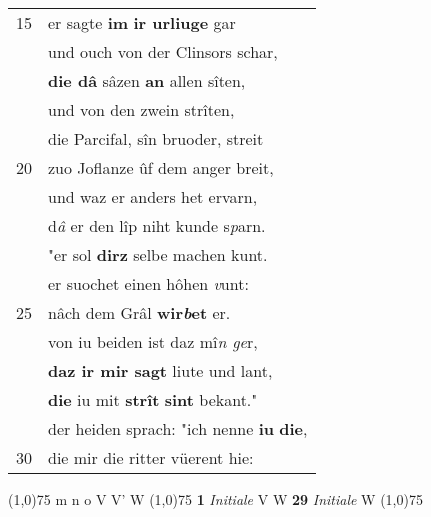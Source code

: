 \documentclass[8pt,a4paper,notitlepage]{article}
\begin{document}
\begin{table}[ht]
\begin{minipage}[t]{0.5\linewidth}
\begin{tabular}{rl}
15 & er sagte \textbf{im} \textbf{ir urliuge} gar\\ 
 & und ouch von der Clinsors schar,\\ 
 & \textbf{die dâ} sâzen \textbf{an} allen sîten,\\ 
 & und von den zwein strîten,\\ 
 & die Parcifal, sîn bruoder, streit\\ 
20 & zuo Joflanze ûf dem anger breit,\\ 
 & und waz er anders het ervarn,\\ 
 & d\textit{â} er den lîp niht kunde s\textit{p}arn.\\ 
 & "er sol \textbf{dirz} selbe machen kunt.\\ 
 & er suochet einen hôhen \textit{v}unt:\\ 
25 & nâch dem Grâl \textbf{wir\textit{b}et} er.\\ 
 & von iu beiden ist daz mî\textit{n ge}r,\\ 
 & \textbf{daz ir mir sagt} liute und lant,\\ 
 & \textbf{die} iu mit \textbf{strît} \textbf{sint} bekant."\\ 
 & der heiden sprach: "ich nenne \textbf{iu} \textbf{die},\\ 
30 & die mir die ritter vüerent hie:\\ 
\end{tabular}
\scriptsize
\line(1,0){75} \newline
m n o V V' W \newline
\line(1,0){75} \newline
\textbf{1} \textit{Initiale} V W  \textbf{29} \textit{Initiale} W  \newline
\line(1,0){75} \newline

\end{minipage}
\end{table}
\end{document}

